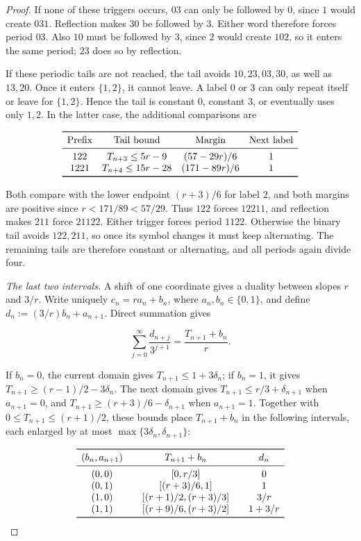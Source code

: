 \documentclass[11pt,a4paper]{amsart}
\numberwithin{equation}{section}
\theoremstyle{definition}
\begin{document}
\begin{proof}
If none of these triggers occurs, \(03\) can only be followed
by \(0\), since \(1\) would create \(031\). Reflection makes
\(30\) be followed by \(3\). Either word therefore forces period
\(03\). Also \(10\) must be followed by \(3\), since \(2\)
would create \(102\), so it enters the same period; \(23\) does
so by reflection.

If these periodic tails are not reached, the tail avoids
\(10,23,03,30\), as well as \(13,20\). Once it enters
\(\{1,2\}\), it cannot leave. A label \(0\) or \(3\) can
only repeat itself or leave for \(\{1,2\}\). Hence the tail is
constant \(0\), constant \(3\), or eventually uses only \(1,2\).
In the latter case, the additional comparisons are

\[
\begin{array}{c@{\quad}c@{\quad}c@{\quad}c}
\toprule
\text{Prefix} & \text{Tail bound} & \text{Margin} & \text{Next label}\\
\midrule
122 & T_{n+3}\le5r-9 & (57-29r)/6 & 1\\
1221 & T_{n+4}\le15r-28 & (171-89r)/6 & 1\\
\bottomrule
\end{array}
\]

Both compare with the lower endpoint \((r+3)/6\) for label \(2\),
and both margins are positive since \(r<171/89<57/29\).
Thus \(122\) forces \(12211\), and reflection makes \(211\)
force \(21122\). Either trigger forces period \(1122\).
Otherwise the binary tail avoids \(122,211\), so once its symbol
changes it must keep alternating. The remaining tails are therefore
constant or alternating, and all periods again divide four.

\emph{The last two intervals.}
A shift of one coordinate gives a duality between slopes \(r\)
and \(3/r\). Write uniquely \(c_n=r a_n+b_n\), where
\(a_n,b_n\in\{0,1\}\), and define
\(d_n:=(3/r)b_n+a_{n+1}\). Direct summation gives

\[
\sum_{j=0}^{\infty}\frac{d_{n+j}}{3^{j+1}}
=\frac{T_{n+1}+b_n}{r}.
\]

If \(b_n=0\), the current domain gives
\(T_{n+1}\le1+3\delta_n\); if \(b_n=1\), it gives
\(T_{n+1}\ge(r-1)/2-3\delta_n\).
The next domain gives \(T_{n+1}\le r/3+\delta_{n+1}\) when
\(a_{n+1}=0\), and \(T_{n+1}\ge(r+3)/6-\delta_{n+1}\) when
\(a_{n+1}=1\). Together with \(0\le T_{n+1}\le(r+1)/2\),
these bounds place \(T_{n+1}+b_n\) in the following intervals,
each enlarged by at most \(\max\{3\delta_n,\delta_{n+1}\}\):

\[
\begin{array}{c@{\qquad}c@{\qquad}c}
\toprule
(b_n,a_{n+1}) & T_{n+1}+b_n & d_n\\
\midrule
(0,0)&[0,r/3]&0\\
(0,1)&[(r+3)/6,1]&1\\
(1,0)&[(r+1)/2,(r+3)/3]&3/r\\
(1,1)&[(r+9)/6,(r+3)/2]&1+3/r\\
\bottomrule
\end{array}
\]


\end{proof}
\end{document}
